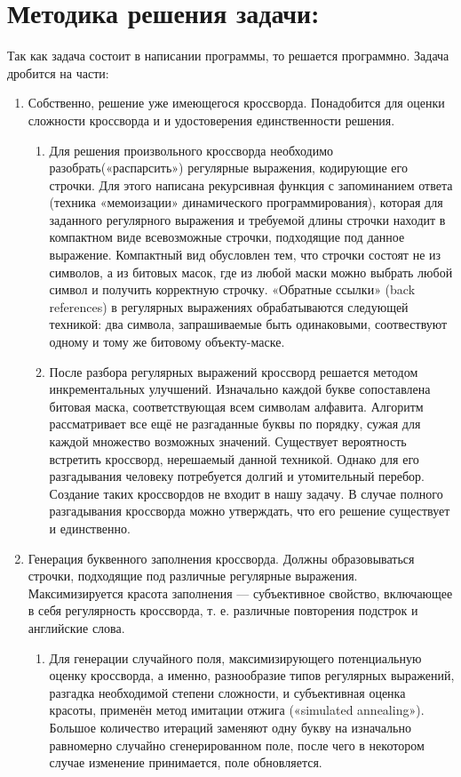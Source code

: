 \documentclass[12pt]{article}
\begin{document}
\section{ Методика решения задачи: }
Так как задача состоит в написании программы, то решается программно. Задача дробится на части: 
\begin{enumerate} 
\item Собственно, решение уже имеющегося кроссворда. Понадобится для оценки сложности кроссворда и и удостоверения единственности решения.
\begin{enumerate} 
\item Для решения произвольного кроссворда необходимо разобрать(«распарсить») регулярные выражения, кодирующие его строчки. Для этого написана рекурсивная функция с запоминанием ответа (техника «мемоизации» динамического программирования), которая для заданного регулярного выражения и требуемой длины строчки находит в компактном виде всевозможные строчки, подходящие под данное выражение. Компактный вид обусловлен тем, что строчки состоят не из символов, а из битовых масок, где из любой маски можно выбрать любой символ и получить корректную строчку. «Обратные ссылки» (back references) в регулярных выражениях обрабатываются следующей техникой: два символа, запрашиваемые быть одинаковыми, соотвествуют одному и тому же битовому объекту-маске.
\item После разбора регулярных выражений кроссворд решается методом инкрементальных улучшений. Изначально каждой букве сопоставлена битовая маска, соответствующая всем символам алфавита. Алгоритм рассматривает все ещё не разгаданные буквы по порядку, сужая для каждой множество возможных значений. Существует вероятность встретить кроссворд, нерешаемый данной техникой. Однако для его разгадывания человеку потребуется долгий и утомительный перебор. Создание таких кроссвордов не входит в нашу задачу. В случае полного разгадывания кроссворда можно утверждать, что его решение существует и единственно.
\end{enumerate} 
\item Генерация буквенного заполнения кроссворда. Должны образовываться строчки, подходящие под различные регулярные выражения. Максимизируется красота заполнения — субъективное свойство, включающее в себя регулярность кроссворда, т. е. различные повторения подстрок и английские слова.
\begin{enumerate} 
\item Для генерации случайного поля, максимизирующего потенциальную оценку кроссворда, а именно, разнообразие типов регулярных выражений, разгадка необходимой степени сложности, и субъективная оценка красоты, применён метод имитации отжига («simulated annealing»). Большое количество итераций заменяют одну букву на изначально равномерно случайно сгенерированном поле, после чего в некотором случае изменение принимается, поле обновляется.

\end{enumerate}
\end{enumerate}
\end{document}
